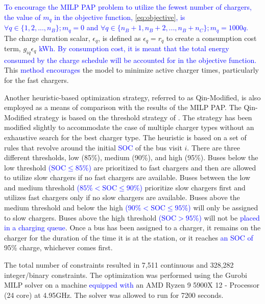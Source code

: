 \documentclass[utf8]{FrontiersinHarvard}
\let\cite\citep                                       %
\newcommand{\contvars}{7,511 }
\newcommand{\intvars}{328,282 }
\newcommand{\timeran}{7200 }                                                    %
\begin{document}
\textcolor{blue}{To encourage the MILP PAP problem to utilize the fewest number of chargers, the value of $m_q$ in the objective function, {\autoref{eq:objective}}, is $\forall q \in \{1,2,..., n_B \}; m_q = 0$ and $\forall q \in \{n_B + 1, n_B + 2,..., n_B + n_C \}; m_q = 1000q$.} The charge duration scalar, \(\epsilon_q\), is defined as \(\epsilon_q = r_q\) to create a
consumption cost term, \(g_{iq}\epsilon_q\) \textcolor{blue}{kWh. By consumption cost, it is meant that the total energy consumed by the charge schedule will be accounted for in the objective function.} This
\textcolor{blue}{method encourages} the model to minimize active charger times, particularly for the fast
chargers.

Another heuristic-based optimization strategy, referred to as Qin-Modified, is also employed as a means of comparison
with the results of the MILP PAP. The Qin-Modified strategy is based on the threshold strategy of
\cite{qin-2016-numer-analy}. The strategy has been modified slightly to accommodate the case of multiple charger types
without an exhaustive search for the best charger type. The heuristic is based on a set of rules that revolve around the
initial \textcolor{blue}{SOC} of the bus visit \(i\). There are three different thresholds, low (85\%),
medium (90\%), and high (95\%). Buses below the low threshold \textcolor{blue}{($\text{SOC} \le 85\%$)} are prioritized to
fast chargers and then are allowed to utilize slow chargers if no fast chargers are available. Buses between the low and
medium threshold \textcolor{blue}{($85\% < \text{SOC} \le 90\%$)} prioritize slow chargers first and utilizes fast chargers
only if no slow chargers are available. Buses above the medium threshold and below the high \textcolor{blue}{($90\% < \text{SOC} \le 95\%$)} will only be assigned to slow chargers. Buses above the high threshold \textcolor{blue}{($\text{SOC} > 95\%$)} will not be \textcolor{blue}{placed in a charging queue}. Once a bus has been assigned to a charger, it remains
on the charger for the duration of the time it is at the station, or it reaches \textcolor{blue}{an SOC of} 95\% charge,
whichever comes first.

The total number of constraints resulted in \contvars continuous and \intvars integer/binary constraints. The
optimization was performed using the Gurobi MILP solver \cite{gurobi-2021-gurob-optim} on a machine
\textcolor{blue}{equipped with} an AMD Ryzen 9 5900X 12 - Processor (24 core) at 4.95GHz. The solver was allowed to run
for \timeran seconds.
\end{document}
